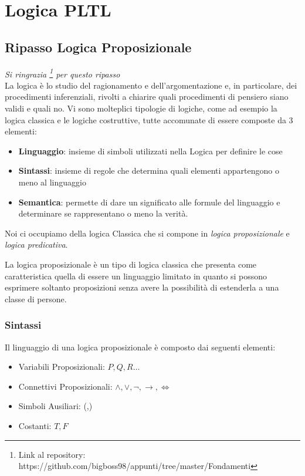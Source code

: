 \documentclass[a4paper,12pt, oneside]{book}
\begin{document}
\chapter{Logica PLTL}
\section{Ripasso Logica Proposizionale}
\emph{Si ringrazia
  \footnote{Link al repository:
    https://github.com/bigboss98/appunti/tree/master/Fondamenti} per questo
  ripasso}\\   
La logica è lo studio del ragionamento e dell’argomentazione e, in particolare,
dei procedimenti inferenziali, rivolti a chiarire quali	procedimenti di pensiero
siano validi e quali no. Vi sono molteplici tipologie di logiche, come ad
esempio la logica classica e le logiche costruttive, tutte accomunate di essere
composte da 3 elementi: 
\begin{itemize}
  \item \textbf{Linguaggio}: insieme di simboli utilizzati nella Logica per
  definire le cose 
  \item \textbf{Sintassi}: insieme di regole che determina quali elementi
  appartengono o meno al linguaggio 
  \item \textbf{Semantica}: permette di dare un significato alle formule del
  linguaggio e determinare se rappresentano o meno la verità.
\end{itemize}

Noi ci occupiamo della logica Classica che si compone in \textit{logica
  proposizionale} e \textit{logica predicativa}.

La logica proposizionale è un tipo di logica classica che presenta come
caratteristica quella di essere un linguaggio limitato in quanto si possono
esprimere soltanto proposizioni senza avere la possibilità di estenderla a una
classe di persone.
\newpage
\subsection{Sintassi}
Il linguaggio di una logica proposizionale è composto dai seguenti elementi:

\begin{itemize}
  \item Variabili Proposizionali: $P,Q,R \dots$
  \item Connettivi Proposizionali: $\land, \lor, \neg, \rightarrow, \iff$
  \item Simboli Ausiliari: (,)
  \item Costanti: $T,F$
\end{itemize}
\end{document}
